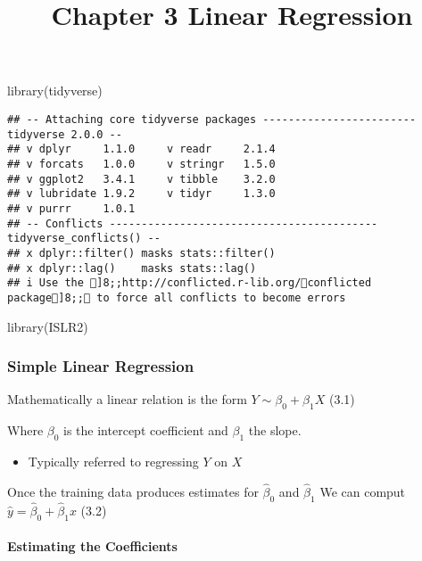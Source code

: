 \documentclass[
]{article}
\title{Chapter 3 Linear Regression}
\author{}
\date{\vspace{-2.5em}}
\newenvironment{Shaded}{\begin{snugshade}}{\end{snugshade}}
\newcommand{\FunctionTok}[1]{\textcolor[rgb]{0.00,0.00,0.00}{#1}}
\newcommand{\NormalTok}[1]{#1}
\providecommand{\tightlist}{%
  \setlength{\itemsep}{0pt}\setlength{\parskip}{0pt}}
\begin{document}
\maketitle

\begin{Shaded}
\begin{Highlighting}[]
\FunctionTok{library}\NormalTok{(tidyverse)}
\end{Highlighting}
\end{Shaded}

\begin{verbatim}
## -- Attaching core tidyverse packages ------------------------ tidyverse 2.0.0 --
## v dplyr     1.1.0     v readr     2.1.4
## v forcats   1.0.0     v stringr   1.5.0
## v ggplot2   3.4.1     v tibble    3.2.0
## v lubridate 1.9.2     v tidyr     1.3.0
## v purrr     1.0.1     
## -- Conflicts ------------------------------------------ tidyverse_conflicts() --
## x dplyr::filter() masks stats::filter()
## x dplyr::lag()    masks stats::lag()
## i Use the ]8;;http://conflicted.r-lib.org/conflicted package]8;; to force all conflicts to become errors
\end{verbatim}

\begin{Shaded}
\begin{Highlighting}[]
\FunctionTok{library}\NormalTok{(ISLR2)}
\end{Highlighting}
\end{Shaded}

\hypertarget{simple-linear-regression}{%
\subsubsection{Simple Linear
Regression}\label{simple-linear-regression}}

Mathematically a linear relation is the form
\(Y \sim \beta_0 + \beta_1 X\) (3.1)

Where \(\beta_0\) is the intercept coefficient and \(\beta_1\) the
slope.

\begin{itemize}
\tightlist
\item
  Typically referred to regressing \(Y\) on \(X\)
\end{itemize}

Once the training data produces estimates for \(\hat\beta_0\) and
\(\hat\beta_1\) We can comput \(\hat{y} = \hat\beta_0 + \hat\beta_1 x\)
(3.2)

\hypertarget{estimating-the-coefficients}{%
\paragraph{Estimating the
Coefficients}\label{estimating-the-coefficients}}
\end{document}
